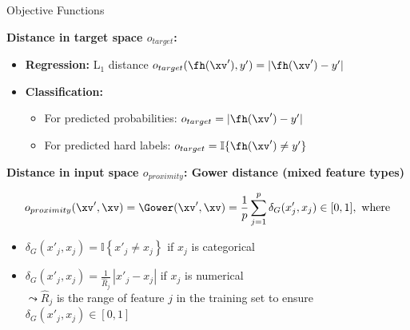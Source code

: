\documentclass[11pt,compress,t,notes=noshow, aspectratio=169, xcolor=table, usenames,dvipsnames]{beamer}
\begin{document}
\begin{frame}{Objective Functions }

\textbf{Distance in target space $o_{target}$:}

\begin{itemize}
  \item \textbf{Regression:} L$_1$ distance   
  $o_{target}(\fh(\xv'), y') = | \fh(\xv') - y'|$
  
  \item \textbf{Classification:}  
  \begin{itemize}
    \item For predicted probabilities: $o_{target} = | \fh(\xv') - y'|$
    \item For predicted hard labels: $o_{target} = \mathbb{I} \{ \fh(\xv') \ne y'\}$
  \end{itemize}
\end{itemize}

\pause

\textbf{Distance in input space $o_{proximity}$: Gower distance (mixed feature types)}

\[
o_{proximity}(\xv', \xv) = \Gower(\xv', \xv) = \frac{1}{p} \sum_{j = 1}^{p} \delta_G(x'_j, x_j) \in [0, 1], \text{ where}
\]


\begin{itemize}
  \item $\delta_G(x'_j, x_j) = \mathbb{I} \left\{ x'_j \ne x_j \right\}$ if $x_j$ is categorical
  \item $\delta_G(x'_j, x_j) = \frac{1}{\widehat{R}_j} \, |x'_j - x_j| $ if $x_j$ is numerical\\
  $\leadsto \widehat{R}_j$ is the range of feature $j$ in the training set to ensure $\delta_G(x'_j, x_j) \in [0, 1]$
\end{itemize}

\end{frame}


	
\end{document}

